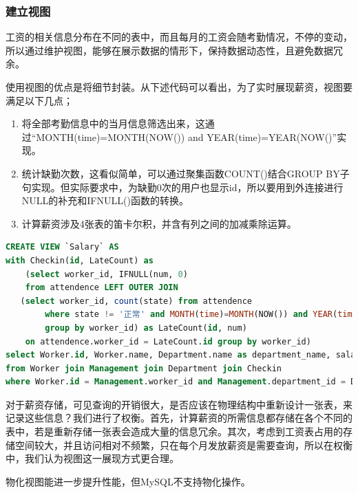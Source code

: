 \documentclass[withoutpreface,bwprint]{cumcmthesis} %
\begin{document}
\subsubsection{建立视图}
工资的相关信息分布在不同的表中，而且每月的工资会随考勤情况，不停的变动，所以通过维护视图，能够在展示数据的情形下，保持数据动态性，且避免数据冗余。\par
使用视图的优点是将细节封装。从下述代码可以看出，为了实时展现薪资，视图要满足以下几点；
\begin{enumerate}
	\item 将全部考勤信息中的当月信息筛选出来，这通过“MONTH(time)=MONTH(NOW()) and YEAR(time)=YEAR(NOW()”实现。
	\item 统计缺勤次数，这看似简单，可以通过聚集函数COUNT()结合GROUP BY子句实现。但实际要求中，为缺勤0次的用户也显示id，所以要用到外连接进行NULL的补充和IFNULL()函数的转换。
	\item 计算薪资涉及4张表的笛卡尔积，并含有列之间的加减乘除运算。
\end{enumerate}
\begin{lstlisting}[language=SQL]
CREATE VIEW `Salary` AS 
with Checkin(id, LateCount) as 
	(select worker_id, IFNULL(num, 0) 
    from attendence LEFT OUTER JOIN 
   (select worker_id, count(state) from attendence 
		where state != '正常' and MONTH(time)=MONTH(NOW()) and YEAR(time)=YEAR(NOW())
		group by worker_id) as LateCount(id, num) 
    on attendence.worker_id = LateCount.id group by worker_id)
select Worker.id, Worker.name, Department.name as department_name, salary, base_salary, -100*Checkin.LateCount as LatePunish, salary+base_salary-100*Checkin.LateCount as total_salary 
from Worker join Management join Department join Checkin 
where Worker.id = Management.worker_id and Management.department_id = Department.id and Worker.id = Checkin.id;
\end{lstlisting}
对于薪资存储，可见查询的开销很大，是否应该在物理结构中重新设计一张表，来记录这些信息？我们进行了权衡。首先，计算薪资的所需信息都存储在各个不同的表中，若是重新存储一张表会造成大量的信息冗余。其次，考虑到工资表占用的存储空间较大，并且访问相对不频繁，只在每个月发放薪资是需要查询，所以在权衡中，我们认为视图这一展现方式更合理。
\par 物化视图能进一步提升性能，但MySQL不支持物化操作。
\end{document}
